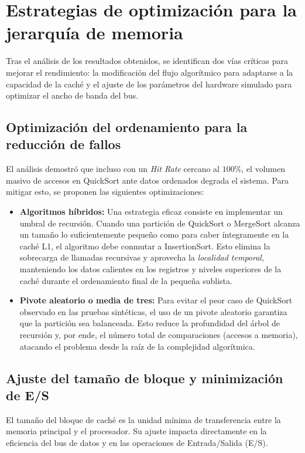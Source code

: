 \documentclass[12pt, a4paper]{article}
\begin{document}
	\section{Estrategias de optimización para la jerarquía de memoria}
	
	Tras el análisis de los resultados obtenidos, se identifican dos vías críticas para mejorar el rendimiento: la modificación del flujo algorítmico para adaptarse a la capacidad de la caché y el ajuste de los parámetros del hardware simulado para optimizar el ancho de banda del bus.
	
	\subsection{Optimización del ordenamiento para la reducción de fallos}
	El análisis demostró que incluso con un \textit{Hit Rate} cercano al $100\%$, el volumen masivo de accesos en QuickSort ante datos ordenados degrada el sistema. Para mitigar esto, se proponen las siguientes optimizaciones:
	
	\begin{itemize}
		\item \textbf{Algoritmos híbridos:} Una estrategia eficaz consiste en implementar un umbral de recursión. Cuando una partición de QuickSort o MergeSort alcanza un tamaño lo suficientemente pequeño como para caber íntegramente en la caché L1, el algoritmo debe conmutar a InsertionSort. Esto elimina la sobrecarga de llamadas recursivas y aprovecha la \textit{localidad temporal}, manteniendo los datos calientes en los registros y niveles superiores de la caché durante el ordenamiento final de la pequeña sublista.
		
		\item \textbf{Pivote aleatorio o media de tres:} Para evitar el peor caso de QuickSort observado en las pruebas sintéticas, el uso de un pivote aleatorio garantiza que la partición sea balanceada. Esto reduce la profundidad del árbol de recursión y, por ende, el número total de comparaciones (accesos a memoria), atacando el problema desde la raíz de la complejidad algorítmica.
	\end{itemize}
	
	\subsection{Ajuste del tamaño de bloque y minimización de E/S}
	El tamaño del bloque de caché es la unidad mínima de transferencia entre la memoria principal y el procesador. Su ajuste impacta directamente en la eficiencia del bus de datos y en las operaciones de Entrada/Salida (E/S).\\
	
\end{document}
